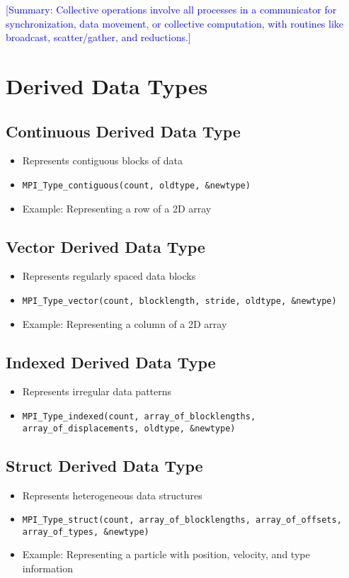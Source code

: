 \documentclass[12pt]{article}
\begin{document}
\textcolor{blue}{[Summary: Collective operations involve all processes in a communicator for synchronization, data movement, or collective computation, with routines like broadcast, scatter/gather, and reductions.]}

\section{Derived Data Types}

\subsection{Continuous Derived Data Type}
\begin{itemize}
    \item Represents contiguous blocks of data
    \item \texttt{MPI\_Type\_contiguous(count, oldtype, \&newtype)}
    \item Example: Representing a row of a 2D array
\end{itemize}

\subsection{Vector Derived Data Type}
\begin{itemize}
    \item Represents regularly spaced data blocks
    \item \texttt{MPI\_Type\_vector(count, blocklength, stride, oldtype, \&newtype)}
    \item Example: Representing a column of a 2D array
\end{itemize}

\subsection{Indexed Derived Data Type}
\begin{itemize}
    \item Represents irregular data patterns
    \item \texttt{MPI\_Type\_indexed(count, array\_of\_blocklengths, array\_of\_displacements, oldtype, \&newtype)}
\end{itemize}

\subsection{Struct Derived Data Type}
\begin{itemize}
    \item Represents heterogeneous data structures
    \item \texttt{MPI\_Type\_struct(count, array\_of\_blocklengths, array\_of\_offsets, array\_of\_types, \&newtype)}
    \item Example: Representing a particle with position, velocity, and type information
\end{itemize}
\end{document}
